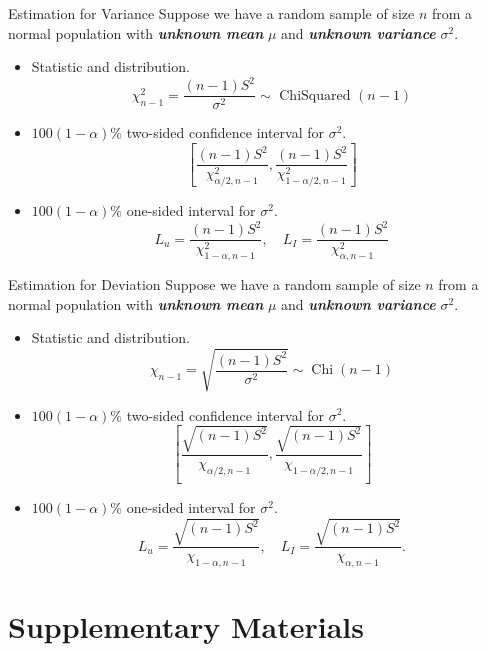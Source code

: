 \documentclass{beamer}
\newcommand{\bb}[1]{\textcolor{antiquefuchsia}{\textbf{\textit{#1}}}}
\begin{document}
\begin{frame}{Estimation for Variance}
Suppose we have a random sample of size $n$ from a normal population with \bb{unknown mean} $\mu$ and \bb{unknown variance} $\sigma^{2}$.
\begin{itemize}
\item Statistic and distribution.
$$
\chi_{n-1}^{2}=\frac{(n-1) S^{2}}{\sigma^{2}} \sim \text { ChiSquared }(n-1)
$$
\item $100(1-\alpha) \%$ two-sided confidence interval for $\sigma^{2}$.
$$
\left[\frac{(n-1) S^{2}}{\chi_{\alpha / 2, n-1}^{2}}, \frac{(n-1) S^{2}}{\chi_{1-\alpha / 2, n-1}^{2}}\right]
$$
\item $100(1-\alpha) \%$ one-sided interval for $\sigma^{2}$.
$$
L_{u}=\frac{(n-1) S^{2}}{\chi_{1-\alpha, n-1}^{2}}, \quad L_{I}=\frac{(n-1) S^{2}}{\chi_{\alpha, n-1}^{2}}
$$
\end{itemize}
\end{frame}

\begin{frame}{Estimation for Deviation}
Suppose we have a random sample of size $n$ from a normal population with \bb{unknown mean} $\mu$ and \bb{unknown variance} $\sigma^{2}$.
\begin{itemize}
\item Statistic and distribution.
$$
\chi_{n-1}=\sqrt{\frac{(n-1) S^{2}}{\sigma^{2}}} \sim \operatorname{Chi}(n-1)
$$
\item $100(1-\alpha) \%$ two-sided confidence interval for $\sigma^{2}$.
$$
\left[\frac{\sqrt{(n-1) S^{2}}}{\chi_{\alpha / 2, n-1}}, \frac{\sqrt{(n-1) S^{2}}}{\chi_{1-\alpha / 2, n-1}}\right]
$$
\item $100(1-\alpha) \%$ one-sided interval for $\sigma^{2}$.
$$
L_{u}=\frac{\sqrt{(n-1) S^{2}}}{\chi_{1-\alpha, n-1}}, \quad L_{I}=\frac{\sqrt{(n-1) S^{2}}}{\chi_{\alpha, n-1}} .
$$
\end{itemize}
\end{frame}

\section{Supplementary Materials}
\end{document}
